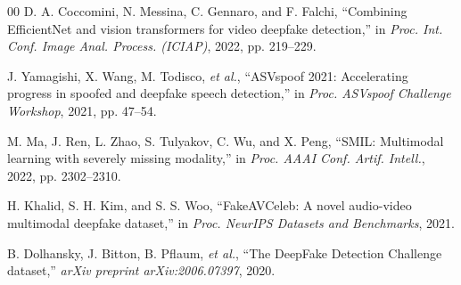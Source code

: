 \documentclass[conference]{IEEEtran}
\begin{document}
\begin{thebibliography}{00}
 D. A. Coccomini, N. Messina, C. Gennaro, and F. Falchi, ``Combining EfficientNet and vision transformers for video deepfake detection,'' in \textit{Proc. Int. Conf. Image Anal. Process. (ICIAP)}, 2022, pp. 219--229.

 J. Yamagishi, X. Wang, M. Todisco, \textit{et al.}, ``ASVspoof 2021: Accelerating progress in spoofed and deepfake speech detection,'' in \textit{Proc. ASVspoof Challenge Workshop}, 2021, pp. 47--54.

 M. Ma, J. Ren, L. Zhao, S. Tulyakov, C. Wu, and X. Peng, ``SMIL: Multimodal learning with severely missing modality,'' in \textit{Proc. AAAI Conf. Artif. Intell.}, 2022, pp. 2302--2310.

 H. Khalid, S. H. Kim, and S. S. Woo, ``FakeAVCeleb: A novel audio-video multimodal deepfake dataset,'' in \textit{Proc. NeurIPS Datasets and Benchmarks}, 2021.

 B. Dolhansky, J. Bitton, B. Pflaum, \textit{et al.}, ``The DeepFake Detection Challenge dataset,'' \textit{arXiv preprint arXiv:2006.07397}, 2020.

\end{thebibliography}
\end{document}
